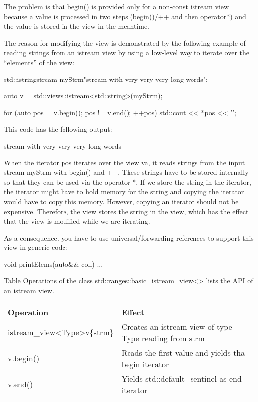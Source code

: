 The problem is that begin() is provided only for a non-const istream view because a value is processed in two steps (begin()/++ and then operator*) and the value is stored in the view in the meantime.

The reason for modifying the view is demonstrated by the following example of reading strings from an istream view by using a low-level way to iterate over the “elements” of the view:

\begin{cpp}
std::istringstream myStrm{"stream with very-very-very-long words"};

auto v = std::views::istream<std::string>(myStrm);

for (auto pos = v.begin(); pos != v.end(); ++pos) {
	std::cout << *pos << '\n';
}
\end{cpp}

This code has the following output:

\begin{shell}
stream
with
very-very-very-long
words
\end{shell}

When the iterator pos iterates over the view va, it reads strings from the input stream myStrm with begin() and ++. These strings have to be stored internally so that they can be used via the operator *. If we store the string in the iterator, the iterator might have to hold memory for the string and copying the iterator would have to copy this memory. However, copying an iterator should not be expensive. Therefore, the view stores the string in the view, which has the effect that the view is modified while we are iterating.

As a consequence, you have to use universal/forwarding references to support this view in generic code:

\begin{cpp}
void printElems(auto&& coll) {
	...
}
\end{cpp}


Table Operations of the class std::ranges::basic\_istream\_view<> lists the API of an istream view.

\begin{longtable}[c]{|l|l|}
\hline
\textbf{Operation} & \textbf{Effect}                                     \\ \hline
\endfirsthead
%
\endhead
%
istream\_view\textless{}Type\textgreater v\{strm\} & Creates an istream view of type Type reading from strm \\ \hline
v.begin()          & Reads the first value and yields tha begin iterator \\ \hline
v.end()            & Yields std::default\_sentinel as end iterator       \\ \hline
\end{longtable}

